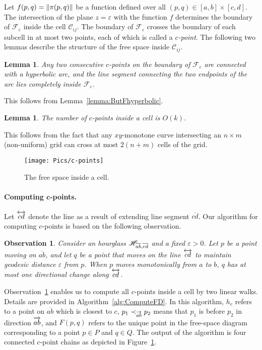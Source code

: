 \documentclass[12pt]{dalthesis}
\def\favoritefont{\bfseries \sffamily}
\def\QED{\ensuremath{{\Box}}}
\def\markatright#1{\leavevmode\unskip\nobreak\quad\hspace*{\fill}{#1}}
\newenvironment{proof}
	{\begin{trivlist}\item[\hskip\labelsep{\favoritefont Proof:}]}
	{\markatright{\QED}\end{trivlist}}
\newtheorem{lemma}[theorem]{Lemma}
\newtheorem{obs}{Observation}
\newcommand{\eps}{\varepsilon}
\newcommand{\CF}{{\mathscr F}}
\newcommand{\CC}{{\mathscr C}}
\newcommand{\cell}[1]{{\CC_{#1}}}
\newcommand{\Feps}{\CF_\eps}
\newcommand{\Ov}[1]{\overline{#1}}
\newcommand{\PP}{{F}}
\newcommand{\Seg}[1]{{\overline{#1}}}
\begin{document}
Let $f(p,q) = \| \pi(p,q) \|$ be a function
defined over all $(p,q) \in [a,b] \times [c,d]$.
The intersection of the plane $z=\eps$ with the function $f$ determines the 
boundary of $\Feps$ inside the cell $\cell{ij}$.
The boundary of $\Feps$ crosses the boundary of each subcell 
in at most two points, each of which is called a \emph{$c$-point}.
The following two lemmas describe the structure of the free space inside  $\cell{ij}$.

\begin{lemma}
	Any two consecutive $c$-points on the boundary of $\Feps$ 
	are connected with a hyperbolic arc, 
	and the line segment connecting the two endpoints of the arc lies completely inside $\Feps$.
\end{lemma}
\begin{proof}
	This follows from Lemma~\ref{lemma:ButFhyperbolic}.
\end{proof}

\begin{lemma}
	The number of $c$-points inside a cell is $O(k)$. 
\end{lemma}
\begin{proof}
	This follows from the fact that 
any $xy$-monotone curve intersecting an $n \times m$ (non-uniform) grid 
	can cross at most $2(n+m)$ cells of the grid.
\end{proof}


\begin{figure}[h]
	\centering
	\texttt{[image: Pics/c-points]}
	\caption{ The free space inside a cell. }
	\label{fig:c-pointschains}
\end{figure}


\paragraph{Computing c-points.}
Let $\overleftrightarrow{cd}$ denote the line as a result of 
extending line segment $\Seg{cd}$.
Our algorithm for computing $c$-points is based on the following observation.

\begin{obs} \label{lemma:shrinkexpand}
	Consider an hourglass ${\mathscr H}_{\overline{ab},\overline{cd}}$ and a fixed $\eps > 0$.
	Let $p$ be a point moving on $\Ov{ab}$,
	and let $q$ be a point that moves on the 
	line $\overleftrightarrow{cd}$  to maintain 
	geodesic distance $\eps$ from $p$.
When $p$ moves monotonically from $a$ to $b$,  
	$q$ has at most one directional change along $\overleftrightarrow{cd}$.
\end{obs}


Observation~\ref{lemma:shrinkexpand} enables us to compute all $c$-points inside a cell
by two linear walks. Details are provided in Algorithm~\ref{alg:ComputeFD}.
In this algorithm, $h_c$ refers to a point on $\Ov{ab}$ which is closest to $c$,
$p_1 \prec_{\overrightarrow{ab}} p_2$ means that 
$p_1$ is before $p_2$ in direction $\overrightarrow{ab}$,
and $\PP(p,q)$ refers to the unique point in the free-space diagram 
corresponding to a point $p \in P$ and $q \in Q$.
The output of the algorithm is four connected $c$-point chains
as depicted in Figure~\ref{fig:c-pointschains}.
\end{document}
